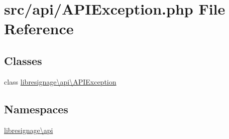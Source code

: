 \hypertarget{APIException_8php}{}\section{src/api/\+A\+P\+I\+Exception.php File Reference}
\label{APIException_8php}
\subsection*{Classes}
\begin{DoxyCompactItemize}
\item 
class \hyperlink{classlibresignage_1_1api_1_1APIException}{libresignage\textbackslash{}api\textbackslash{}\+A\+P\+I\+Exception}
\end{DoxyCompactItemize}
\subsection*{Namespaces}
\begin{DoxyCompactItemize}
\item 
 \hyperlink{namespacelibresignage_1_1api}{libresignage\textbackslash{}api}
\end{DoxyCompactItemize}
